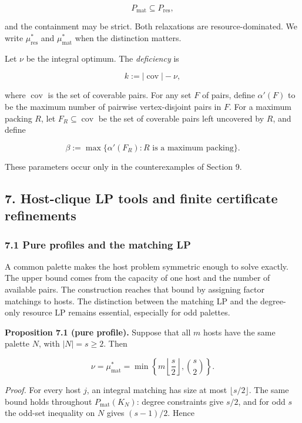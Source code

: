 \documentclass[english,11pt,a4paper]{article}
\begin{document}
\[
P_{\mathrm{mat}}\subseteq P_{\mathrm{res}},
\]

and the containment may be strict. Both relaxations are
resource-dominated. We write \(\mu^*_{\mathrm{res}}\) and
\(\mu^*_{\mathrm{mat}}\) when the distinction matters.

Let \(\nu\) be the integral optimum. The \emph{deficiency} is

\[
k:=|\operatorname{cov}|-\nu,
\]

where \(\operatorname{cov}\) is the set of coverable pairs. For any set
\(F\) of pairs, define \(\alpha'(F)\) to be the maximum number of
pairwise vertex-disjoint pairs in \(F\). For a maximum packing \(R\),
let \(F_R\subseteq\operatorname{cov}\) be the set of coverable pairs
left uncovered by \(R\), and define

\[
\beta:=\max\{\alpha'(F_R): R\text{ is a maximum packing}\}.
\]

These parameters occur only in the counterexamples of Section 9.

\subsection{7. Host-clique LP tools and finite certificate
refinements}\label{host-clique-lp-tools-and-finite-certificate-refinements}

\subsubsection{7.1 Pure profiles and the matching
LP}\label{pure-profiles-and-the-matching-lp}

A common palette makes the host problem symmetric enough to solve
exactly. The upper bound comes from the capacity of one host and the
number of available pairs. The construction reaches that bound by
assigning factor matchings to hosts. The distinction between the
matching LP and the degree-only resource LP remains essential,
especially for odd palettes.

\textbf{Proposition 7.1 (pure profile).} Suppose that all \(m\) hosts
have the same palette \(N\), with \(|N|=s\ge2\). Then

\[
\nu
=
\mu^*_{\mathrm{mat}}
=
\min\left\{
m\left\lfloor\frac{s}{2}\right\rfloor,
\binom{s}{2}
\right\}.
\]

\emph{Proof.} For every host \(j\), an integral matching has size at
most \(\lfloor s/2\rfloor\). The same bound holds throughout
\(P_{\mathrm{mat}}(K_N)\): degree constraints give \(s/2\), and for odd
\(s\) the odd-set inequality on \(N\) gives \((s-1)/2\). Hence
\end{document}
